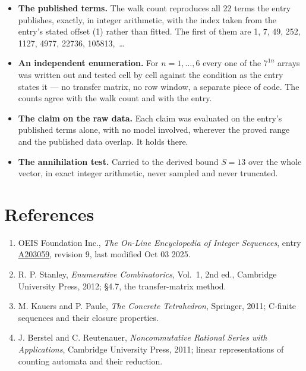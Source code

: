 \documentclass[11pt]{article}
\theoremstyle{definition}
\begin{document}
\begin{itemize}

\item {\bfseries The published terms.} The walk count reproduces all 22 terms the entry publishes, exactly, in integer arithmetic, with the index taken from the entry's stated offset (1) rather than fitted. The first of them are 1, 7, 49, 252, 1127, 4977, 22736, 105813,~\dots

\item {\bfseries An independent enumeration.} For $n = 1,\dots,6$ every one of the $7^{1n}$ arrays was written out and tested cell by cell against the condition as the entry states it --- no transfer matrix, no row window, a separate piece of code. The counts agree with the walk count and with the entry.

\item {\bfseries The claim on the raw data.} Each claim was evaluated on the entry's published terms alone, with no model involved, wherever the proved range and the published data overlap. It holds there.

\item {\bfseries The annihilation test.} Carried to the derived bound $S = 13$ over the whole vector, in exact integer arithmetic, never sampled and never truncated.

\end{itemize}

\section{References}

\begin{enumerate}

\item OEIS Foundation Inc., \emph{The On-Line Encyclopedia of Integer Sequences}, entry \href{https://oeis.org/A203059}{A203059}, revision 9, last modified Oct 03 2025.

\item R. P. Stanley, \emph{Enumerative Combinatorics}, Vol.~1, 2nd ed., Cambridge University Press, 2012; \S4.7, the transfer-matrix method.

\item M. Kauers and P. Paule, \emph{The Concrete Tetrahedron}, Springer, 2011; C-finite sequences and their closure properties.

\item J. Berstel and C. Reutenauer, \emph{Noncommutative Rational Series with Applications}, Cambridge University Press, 2011; linear representations of counting automata and their reduction.

\end{enumerate}
\end{document}

